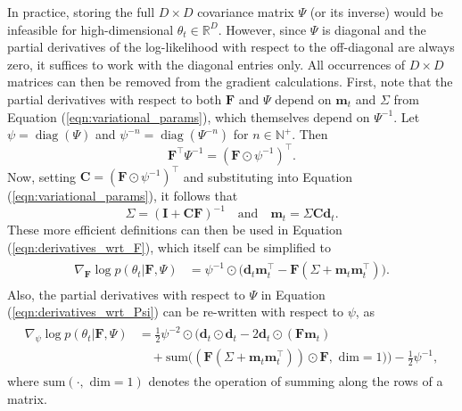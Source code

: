 \documentclass[msc,deptreport.inf]{infthesis} %
\newcommand{\matr}[1]{\mathbf{#1}}
\newcommand{\R}{\mathbb R}
\newcommand{\N}{\mathbb N}
\newcommand{\diag}{\mathop{\mathrm{diag}}}
\begin{document}
In practice, storing the full $D\times D$ covariance matrix $\Psi$ (or its inverse) would be infeasible for high-dimensional $\theta_t \in \R^D$. However, since $\Psi$ is diagonal and the partial derivatives of the log-likelihood with respect to the off-diagonal are always zero, it suffices to work with the diagonal entries only. All occurrences of $D \times D$ matrices can then be removed from the gradient calculations. First, note that the partial derivatives with respect to both $\matr{F}$ and $\Psi$ depend on $\matr{m}_t$ and $\Sigma$ from Equation (\ref{eqn:variational_params}), which themselves depend on  $\Psi^{-1}$. Let $\psi = \diag(\Psi)$ and $\psi^{-n} = \diag(\Psi^{-n})$ for $n \in \N^+$. Then 
\begin{equation}
	\matr{F}^\intercal \Psi^{-1} = (\matr{F} \odot \psi^{-1})^\intercal.
\end{equation}
Now, setting $\matr{C} =  (\matr{F} \odot \psi^{-1})^\intercal$ and substituting into Equation (\ref{eqn:variational_params}), it follows that 
\begin{equation}\label{eqn:efficient_m_and_sigma}
	\Sigma = (\matr{I} + \matr{C} \matr{F})^{-1} \quad \text{and} \quad \matr{m}_t = \Sigma \matr{C} \matr{d}_t.
\end{equation}
These more efficient definitions can then be used in Equation (\ref{eqn:derivatives_wrt_F}), which itself can be simplified to 
\begin{align}\label{eqn:efficient_derivatives_wrt_F}
\begin{split}
	\nabla_{\matr{F}} \log p(\theta_t | \matr{F}, \Psi) 
	& = \psi^{-1} \odot \big(\matr{d}_t \matr{m}_t^\intercal  - \matr{F}  (\Sigma + \matr{m}_t \matr{m}_t^\intercal) \big).
\end{split}
\end{align} 
Also, the partial derivatives with respect to $\Psi$ in Equation (\ref{eqn:derivatives_wrt_Psi}) can be re-written with respect to $\psi$, as 
\begin{align}
\begin{split}\label{eqn:efficient_derivatives_wrt_Psi}
	\nabla_{\psi} \log p(\theta_t | \matr{F}, \Psi) 
	& = \frac{1}{2} \psi^{-2} \odot \Big(\matr{d}_t \odot \matr{d}_t - 2\matr{d}_t \odot (\matr{F} \matr{m}_t) \\
	& \quad + \text{sum}\big((\matr{F} (\Sigma + \matr{m}_t \matr{m}_t^\intercal)) \odot \matr{F}, \text{ dim} = 1\big) \Big)
	 - \frac{1}{2} \psi^{-1},
\end{split}
\end{align} 
where $\text{sum}(\cdot, \text{ dim} = 1)$ denotes the operation of summing along the rows of a matrix. 
\end{document}
